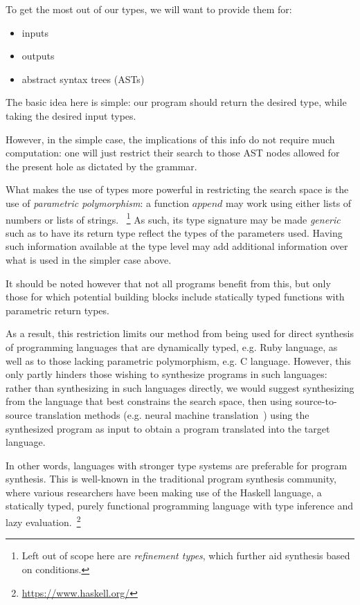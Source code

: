 \documentclass{article}
\begin{document}
To get the most out of our types, we will want to provide them for:
\begin{itemize}
    \item inputs
    \item outputs
    \item abstract syntax trees (ASTs)
\end{itemize}

The basic idea here is simple: our program should return the desired type, while taking the desired input types.

However, in the simple case, the implications of this info do not require much computation: one will just restrict their search to those AST nodes allowed for the present hole as dictated by the grammar.

What makes the use of types more powerful in restricting the search space is the use of \emph{parametric polymorphism}: a function $append$ may work using either lists of numbers or lists of strings.
~\footnote{Left out of scope here are \emph{refinement types}, which further aid synthesis based on conditions.}
As such, its type signature may be made \emph{generic} such as to have its return type reflect the types of the parameters used. Having such information available at the type level may add additional information over what is used in the simpler case above.

It should be noted however that not all programs benefit from this, but only those for which potential building blocks include statically typed functions with parametric return types.

As a result, this restriction limits our method from being used for direct synthesis of programming languages that are dynamically typed, e.g. Ruby language, as well as to those lacking parametric polymorphism, e.g. C language.
However, this only partly hinders those wishing to synthesize programs in such languages: rather than synthesizing in such languages directly, we would suggest synthesizing from the language that best constrains the search space, then using source-to-source translation methods (e.g. neural machine translation~\citep{kalchbrenner2013recurrent})
using the synthesized program as input to obtain a program translated into the target language.

In other words, languages with stronger type systems are preferable for program synthesis.
This is well-known in the traditional program synthesis community, where various researchers
have been making use of the Haskell language, a statically typed, purely functional programming language with type inference and lazy evaluation.~\footnote{\url{https://www.haskell.org/}}
\end{document}

